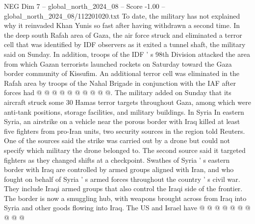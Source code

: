 \begin{textsample}{NEG Dim 7 – global\_north\_2024\_08 – Score -1.00 – global\_north\_2024\_08/112201020.txt}
To date, the military has not explained why it reinvaded Khan Yunis so fast after having withdrawn a second time.
In the deep south Rafah area of Gaza, the air force struck and eliminated a terror cell that was identified by IDF observers as it exited a tunnel shaft, the military said on Sunday.
In addition, troops of the IDF ' s 98th Division attacked the area from which Gazan terrorists launched rockets on Saturday toward the Gaza border community of Kissufim.
An additional terror cell was eliminated in the Rafah area by troops of the Nahal Brigade in conjunction with the IAF after forces had @ @ @ @ @ @ @ @ @ @.
The military added on Sunday that its aircraft struck some 30 Hamas terror targets throughout Gaza, among which were anti-tank positions, storage facilities, and military buildings.
In Syria In eastern Syria, an airstrike on a vehicle near the porous border with Iraq killed at least five fighters from pro-Iran units, two security sources in the region told Reuters.
One of the sources said the strike was carried out by a drone but could not specify which military the drone belonged to.
The second source said it targeted fighters as they changed shifts at a checkpoint.
Swathes of Syria ' s eastern border with Iraq are controlled by armed groups aligned with Iran, and who fought on behalf of Syria ' s armed forces throughout the country ' s civil war.
They include Iraqi armed groups that also control the Iraqi side of the frontier.
The border is now a smuggling hub, with weapons brought across from Iraq into Syria and other goods flowing into Iraq.
The US and Israel have @ @ @ @ @ @ @ @ @ @

\end{textsample}
